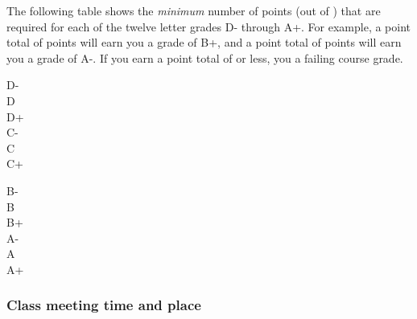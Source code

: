 \documentclass[12pt]{article}
\newcounter{ex}\setcounter{ex}{0}
\newenvironment{mypar}[2]
  {\begin{list}{}%
    {\setlength\leftmargin{#1}
    \setlength\rightmargin{#2}}
    \item[]}
  {\end{list}}
\begin{document}





The following table shows the \emph{minimum} number of points (out of \points) that
are required for each of the twelve letter grades D- through A+. For
example, a point total of \Bp\/  points will earn you a grade of B+,  and 
a point total of \Am\/ points will earn you a grade of A-. If you earn a point
total of \F\/  or less, you a failing course grade.
 
 \vspace{0.1in}
     \begin{minipage}{5.5in}
  \centering 
\begin{mypar}{0.25in}{0.25in}
    \begin{minipage}{2.5in}
        D-  \dotfill \Dm \\
        D \dotfill \D \\
        D+ \dotfill \Dp \\
        C- \dotfill \Cm  \\
        C \dotfill \C \\
        C+ \dotfill \Cp 
        \end{minipage}
    \phantom{xxx}
    \begin{minipage}{2.5in}
        B- \dotfill \Bm \\
        B \dotfill  \B \\
        B+ \dotfill  \Bp\\
        A- \dotfill  \Am \\
        A \dotfill  \A \\
        A+ \dotfill  \Ap
    \end{minipage}
\end{mypar} 
\end{minipage}

\subsubsection*{Class meeting time and place}
\end{document}
